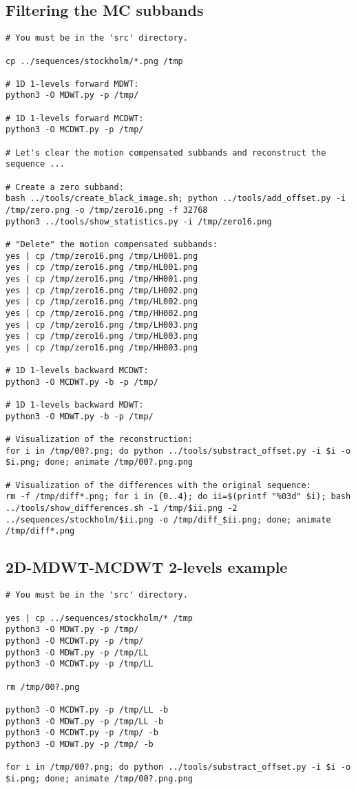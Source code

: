 \subsection{Filtering the MC subbands}
\begin{verbatim}
# You must be in the 'src' directory.

cp ../sequences/stockholm/*.png /tmp

# 1D 1-levels forward MDWT:
python3 -O MDWT.py -p /tmp/

# 1D 1-levels forward MCDWT:
python3 -O MCDWT.py -p /tmp/

# Let's clear the motion compensated subbands and reconstruct the sequence ...

# Create a zero subband:
bash ../tools/create_black_image.sh; python ../tools/add_offset.py -i /tmp/zero.png -o /tmp/zero16.png -f 32768
python3 ../tools/show_statistics.py -i /tmp/zero16.png

# "Delete" the motion compensated subbands:
yes | cp /tmp/zero16.png /tmp/LH001.png
yes | cp /tmp/zero16.png /tmp/HL001.png
yes | cp /tmp/zero16.png /tmp/HH001.png
yes | cp /tmp/zero16.png /tmp/LH002.png
yes | cp /tmp/zero16.png /tmp/HL002.png
yes | cp /tmp/zero16.png /tmp/HH002.png
yes | cp /tmp/zero16.png /tmp/LH003.png
yes | cp /tmp/zero16.png /tmp/HL003.png
yes | cp /tmp/zero16.png /tmp/HH003.png

# 1D 1-levels backward MCDWT:
python3 -O MCDWT.py -b -p /tmp/

# 1D 1-levels backward MDWT:
python3 -O MDWT.py -b -p /tmp/

# Visualization of the reconstruction:
for i in /tmp/00?.png; do python ../tools/substract_offset.py -i $i -o $i.png; done; animate /tmp/00?.png.png

# Visualization of the differences with the original sequence:
rm -f /tmp/diff*.png; for i in {0..4}; do ii=$(printf "%03d" $i); bash ../tools/show_differences.sh -1 /tmp/$ii.png -2 ../sequences/stockholm/$ii.png -o /tmp/diff_$ii.png; done; animate /tmp/diff*.png
\end{verbatim}

\subsection{2D-MDWT-MCDWT 2-levels example}
\begin{verbatim}
# You must be in the 'src' directory.

yes | cp ../sequences/stockholm/* /tmp
python3 -O MDWT.py -p /tmp/
python3 -O MCDWT.py -p /tmp/
python3 -O MDWT.py -p /tmp/LL
python3 -O MCDWT.py -p /tmp/LL

rm /tmp/00?.png

python3 -O MCDWT.py -p /tmp/LL -b
python3 -O MDWT.py -p /tmp/LL -b
python3 -O MCDWT.py -p /tmp/ -b
python3 -O MDWT.py -p /tmp/ -b

for i in /tmp/00?.png; do python ../tools/substract_offset.py -i $i -o $i.png; done; animate /tmp/00?.png.png
\end{verbatim}

